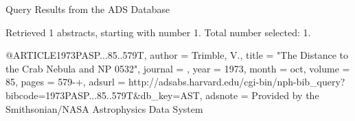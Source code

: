 Query Results from the ADS Database


Retrieved 1 abstracts, starting with number 1.  Total number selected: 1.

@ARTICLE{1973PASP...85..579T,
   author = {{Trimble}, V.},
    title = "{The Distance to the Crab Nebula and NP 0532}",
  journal = {\pasp},
     year = 1973,
    month = oct,
   volume = 85,
    pages = {579-+},
   adsurl = {http://adsabs.harvard.edu/cgi-bin/nph-bib_query?bibcode=1973PASP...85..579T&db_key=AST},
  adsnote = {Provided by the Smithsonian/NASA Astrophysics Data System}
}


